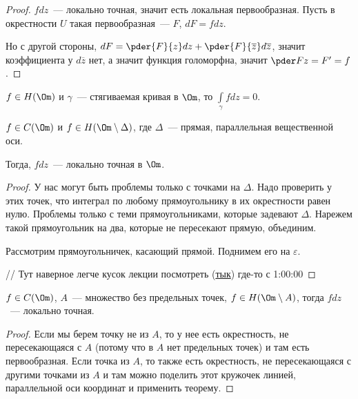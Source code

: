 \begin{proof}
    $fdz$~--- локально точная, значит есть локальная
    первообразная. Пусть в окрестности $U$ такая первообразная~---
    $F$, $dF = fdz$.

    Но с другой стороны,
    $dF = \pder{F}{z}dz + \pder{F}{\overline{z}} d\overline{z}$,
    значит коэффициента у $d\overline {z}$ нет,
    а значит функция голоморфна, значит
    $\pder F z = F' = f$.
\end{proof}

\begin{consequence}
    $f \in H(\Om)$ и $\gamma$~--- стягиваемая
    кривая в $\Om$, то $\int\limits_\gamma fdz = 0$.
\end{consequence}

\begin{theorem}
    $f \in C(\Om)$ и
    $f \in H(\Om \setminus \Delta)$,
    где $\Delta$~--- прямая, параллельная вещественной оси.

    Тогда, $fdz$~--- локально точная в $\Om$.
\end{theorem}

\begin{proof}
    У нас могут быть проблемы только с точками на $\Delta$.
    Надо проверить у этих точек, что интеграл по любому прямоугольнику в их
    окрестности равен нулю. Проблемы только с теми прямоугольниками, которые задевают
    $\Delta$. Нарежем такой прямоугольник на два, которые не
    пересекают прямую, объединим.

    Рассмотрим прямоугольничек, касающий прямой.
    Поднимем его на $\varepsilon$.

    // Тут наверное легче кусок лекции посмотреть
    (\href{https://youtu.be/0cq-BdGbfks}{тык}) где-то с 1:00:00
\end{proof}

\begin{consequence}
    $f \in C(\Om)$,
    $A$~--- множество без предельных точек,
    $f \in H(\Om \setminus A)$, тогда $fdz$~--- локально точная.
\end{consequence}

\begin{proof}
    Если мы берем точку не из $A$, то у нее есть окрестность, не пересекающаяся с $A$ (потому
    что в $A$ нет предельных точек) и там
    есть первообразная. Если точка из $A$, то также есть окрестность, не пересекающаяся с
    другими точками из $A$ и там можно поделить этот кружочек линией, параллельной оси координат и применить теорему.
\end{proof}

